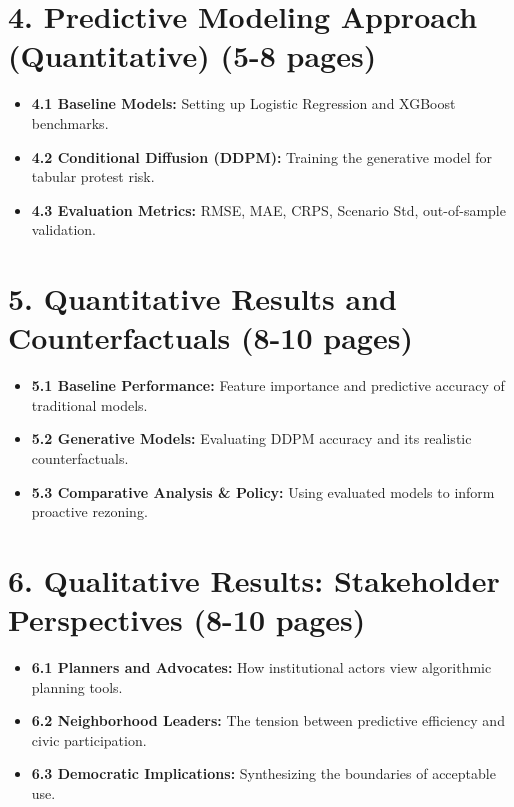 \documentclass[11pt, letterpaper]{article}
\begin{document}
\section*{4. Predictive Modeling Approach (Quantitative) (5-8 pages) \textcolor{columbiablue_official}{\checkmark}}
\begin{itemize}[leftmargin=*, label={\color{columbiablue_official}\tiny$\boxtimes$}, parsep=2pt, itemsep=2pt, topsep=0pt]
    \item \textbf{4.1 Baseline Models:} Setting up Logistic Regression and XGBoost benchmarks.
    \item \textbf{4.2 Conditional Diffusion (DDPM):} Training the generative model for tabular protest risk.
    \item \textbf{4.3 Evaluation Metrics:} RMSE, MAE, CRPS, Scenario Std, out-of-sample validation.
\end{itemize}

\section*{5. Quantitative Results and Counterfactuals (8-10 pages) \textcolor{columbiablue_official}{\checkmark}}
\begin{itemize}[leftmargin=*, label={\color{columbiablue_official}\tiny$\boxtimes$}, parsep=2pt, itemsep=2pt, topsep=0pt]
    \item \textbf{5.1 Baseline Performance:} Feature importance and predictive accuracy of traditional models.
    \item \textbf{5.2 Generative Models:} Evaluating DDPM accuracy and its realistic counterfactuals.
    \item \textbf{5.3 Comparative Analysis \& Policy:} Using evaluated models to inform proactive rezoning.
\end{itemize}

\section*{6. Qualitative Results: Stakeholder Perspectives (8-10 pages)}
\begin{itemize}[leftmargin=*, label={\color{columbiablue_official}\tiny$\square$}, parsep=2pt, itemsep=2pt, topsep=0pt]
    \item \textbf{6.1 Planners and Advocates:} How institutional actors view algorithmic planning tools.
    \item \textbf{6.2 Neighborhood Leaders:} The tension between predictive efficiency and civic participation.
    \item \textbf{6.3 Democratic Implications:} Synthesizing the boundaries of acceptable use.
\end{itemize}
\end{document}

